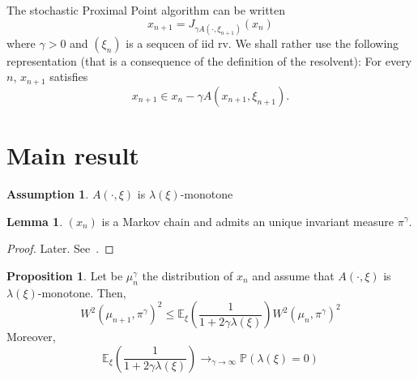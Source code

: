 \documentclass{article}
\newcommand{\1}{\mathbbm 1}
\newcommand{\bP}{{{\mathbb P}}}
\newcommand{\bE}{{{\mathbb E}}}
\theoremstyle{definition}
\newtheorem{lemma}[theorem]{Lemma}
\newtheorem{proposition}[theorem]{Proposition}
\newtheorem{assumption}{Assumption}
\begin{document}
The stochastic Proximal Point algorithm can be written
\begin{equation}
\label{eq:spp}
    x_{n+1} = J_{\gamma A(\cdot,\xi_{n+1})}(x_n)
\end{equation}
where $\gamma >0$ and $(\xi_n)$ is a sequcen of iid rv.
We shall rather use the following representation (that is a consequence of the definition of the resolvent): For every $n$, $x_{n+1}$ satisfies
\begin{equation}
    x_{n+1} \in x_n - \gamma A(x_{n+1},\xi_{n+1}).
\end{equation}

\section{Main result}
\begin{assumption}
$A(\cdot,\xi)$ is $\lambda(\xi)$-monotone
\end{assumption}

\begin{lemma}
$(x_n)$ is a Markov chain and admits an unique invariant measure $\pi^\gamma$.
\end{lemma}
\begin{proof}
Later. See~\cite{duf-livre97}.
\end{proof}

\begin{proposition}
Let be $\mu_n^\gamma$ the distribution of $x_n$ and assume that $A(\cdot,\xi)$ is $\lambda(\xi)$-monotone. Then,
\begin{equation}
    W^2(\mu_{n+1},\pi^\gamma)^2 \leq \bE_\xi\left(\frac{1}{1+2\gamma\lambda(\xi)}\right) W^2(\mu_{n},\pi^\gamma)^2
\end{equation}
Moreover, \begin{equation}
    \label{eq:cvd}
    \bE_\xi\left(\frac{1}{1+2\gamma\lambda(\xi)}\right) \longrightarrow_{\gamma \to \infty} \bP(\lambda(\xi) = 0)
\end{equation} 
\end{proposition}
\end{document}
